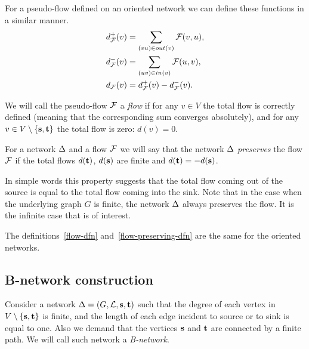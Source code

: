 \documentclass[12pt,oneside,a4paper]{amsart}
\begin{document}
      For a pseudo-flow defined on an oriented network we can define these functions in a similar manner.
      \begin{align*}
        &d^{+}_{\mathcal{F}}(v) = \sum_{(vu) \in out(v)} \mathcal{F}(v, u),\\
        &d^{-}_{\mathcal{F}}(v) = \sum_{(uv) \in in(v)} \mathcal{F}(u, v),\\
        &d_{\mathcal{F}}(v) = d^{+}_{\mathcal{F}}(v) - d^{-}_{\mathcal{F}}(v).
      \end{align*}
      \begin{definition}
        \label{flow-dfn}
        We will call the pseudo-flow $\mathcal{F}$ a \emph{flow} if
          for any $v \in V$ the total flow is correctly defined
          (meaning that the corresponding sum converges absolutely),
          and for any $v \in V \setminus \{\mathbf{s}, \mathbf{t}\}$ the total flow is zero: $d(v) = 0$.
      \end{definition}
      \begin{definition}
        \label{flow-preserving-dfn}
        For a network $\Delta$ and a flow $\mathcal{F}$ we will say that the network $\Delta$ \emph{preserves}
          the flow $\mathcal{F}$ if the total flows $d(\mathbf{t})$, $d(\mathbf{s})$ are finite
          and $d(\mathbf{t}) = -d(\mathbf{s})$.
      \end{definition}
      \begin{remark}
        In simple words this property suggests that the total flow coming out of the source is equal to the total flow
          coming into the sink.
        Note that in the case when the underlying graph $G$ is finite, the network $\Delta$ always preserves the flow.
        It is the infinite case that is of interest.
      \end{remark}
      The definitions~\ref{flow-dfn} and~\ref{flow-preserving-dfn} are the same for the oriented networks.


    \medskip
    \subsection{B-network construction}
      \begin{definition}
        Consider a network $\Delta = (G, \mathcal{L}, \mathbf{s}, \mathbf{t})$ such that
          the degree of each vertex in $V \setminus \{\mathbf{s}, \mathbf{t}\} $ is finite,
          and the length of each edge incident to source or to sink is equal to one.
        Also we demand that the vertices $\mathbf{s}$ and $\mathbf{t}$ are connected by a finite path.
        We will call such network a \emph{B-network}.
      \end{definition}
\end{document}
